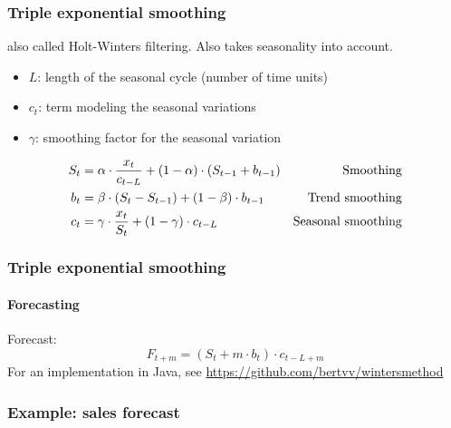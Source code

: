 \documentclass{beamer}
\begin{document}
\begin{frame}
  \frametitle{Triple exponential smoothing}
  also called Holt-Winters filtering. Also takes seasonality into account.

  \begin{itemize}
    \item $L$: length of the seasonal cycle (number of time units)
    \item $c_t$: term modeling the seasonal variations
    \item $\gamma$: smoothing factor for the seasonal variation
  \end{itemize}

\begin{align*}
  S_{t} &= \alpha \cdot \frac{x_{t}}{c_{t-L}} + (1-\alpha) \cdot (S_{t-1} + b_{t-1}) & \textnormal{Smoothing}\\
  b_{t} &= \beta \cdot (S_{t} - S_{t-1}) + (1-\beta) \cdot b_{t-1} & \textnormal{Trend smoothing} \\
  c_{t} &= \gamma \cdot \frac{x_{t}}{S_{t}} + (1-\gamma) \cdot c_{t-L} & \textnormal{Seasonal smoothing} \\
\label{eq:HoltWinters}
\end{align*}

\end{frame}

\begin{frame}
  \frametitle{Triple exponential smoothing}
  \framesubtitle{Forecasting}
  Forecast:
  \[ F_{t+m} = (S_{t} + m \cdot b_{t}) \cdot c_{t-L+m} \]
\vfill  
  For an implementation in Java, see \url{https://github.com/bertvv/wintersmethod}\\
\end{frame}

\begin{frame}
  \frametitle{Example: sales forecast}

  \centering
\end{frame}
\end{document}

